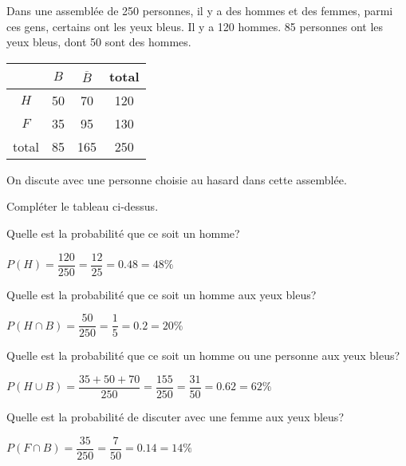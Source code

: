 
Dans une assemblée de 250 personnes, il y a des hommes et des femmes, parmi ces gens, certains ont les yeux bleus. Il y a 120 hommes. 85 personnes ont les yeux bleus, dont 50 sont des hommes.

\begin{center}
\begin{tabular}{|c|c|c|c|}
\hline 
 & $B$ & $\overline{B}$ & total \\ 
\hline 
$H$ & 50 & 70 & 120 \\ 
\hline 
$F$ & 35 & 95 & 130 \\ 
\hline 
total & 85 & 165 & 250 \\ 
\hline 
\end{tabular} 
\end{center}

On discute avec une personne choisie au hasard dans cette assemblée.

\question{}
Compléter le tableau ci-dessus.

\question{}
Quelle est la probabilité que ce soit un homme?

$P(H) = \dfrac{120}{250} = \dfrac{12}{25} = 0.48 = 48\%$

\question{}
Quelle est la probabilité que ce soit un homme aux yeux bleus?

$P(H \cap B) = \dfrac{50}{250} = \dfrac{1}{5} = 0.2 = 20\%$

\question{}
Quelle est la probabilité que ce soit un homme ou une personne aux yeux bleus?

$P(H \cup B) = \dfrac{35+50+70}{250} = \dfrac{155}{250} = \dfrac{31}{50} = 0.62 = 62\%$

\question{}
Quelle est la probabilité de discuter avec une femme aux yeux bleus?

$P(F \cap B) = \dfrac{35}{250} = \dfrac{7}{50} = 0.14 = 14\%$